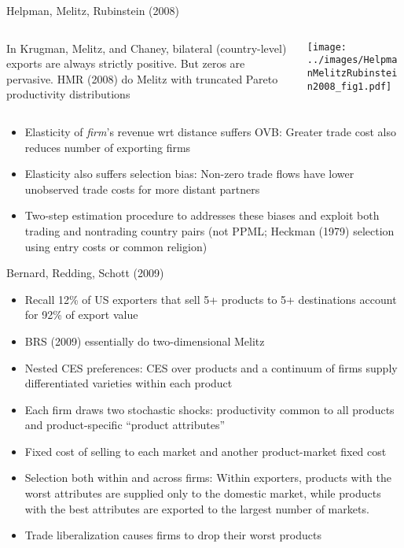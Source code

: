\documentclass[10pt,notes=hide]{beamer}
\begin{document}
\begin{frame}{Helpman, Melitz, Rubinstein (2008)}
\begin{columns}
\begin{column}{.4\textwidth}
In Krugman, Melitz, and Chaney, bilateral (country-level) exports are always strictly positive. But zeros are pervasive.
HMR (2008) do Melitz with truncated Pareto productivity distributions 
\end{column}
\begin{column}{.6\textwidth}
\texttt{[image: ../images/HelpmanMelitzRubinstein2008\_fig1.pdf]}
\end{column}
\end{columns}
\begin{itemize}
	\item Elasticity of \textit{firm}'s revenue wrt distance suffers OVB: 
	Greater trade cost also reduces number of exporting firms
	\item Elasticity also suffers selection bias: 
	Non-zero trade flows have lower unobserved trade costs for more distant partners
	\item Two-step estimation procedure to addresses these biases and exploit both trading and nontrading country pairs (not PPML; Heckman (1979) selection using entry costs or common religion)
\end{itemize}
\end{frame}
\begin{frame}{Bernard, Redding, Schott (2009)}
\begin{itemize}
	\item Recall 12\% of US exporters that sell 5+ products to 5+ destinations account for 92\% of export value
	\item BRS (2009) essentially do two-dimensional Melitz
	\item Nested CES preferences: CES over products and a continuum of firms supply differentiated varieties within each product
	\item Each firm draws two stochastic shocks: productivity common to all products and product-specific ``product attributes''
	\item Fixed cost of selling to each market and another product-market fixed cost
	\item Selection both within and across firms: Within exporters, products with the worst attributes are supplied only to the domestic market, while products with the best attributes are exported to the largest number of markets.
	\item Trade liberalization causes firms to drop their worst products
\end{itemize}
\end{frame}
\end{document}

